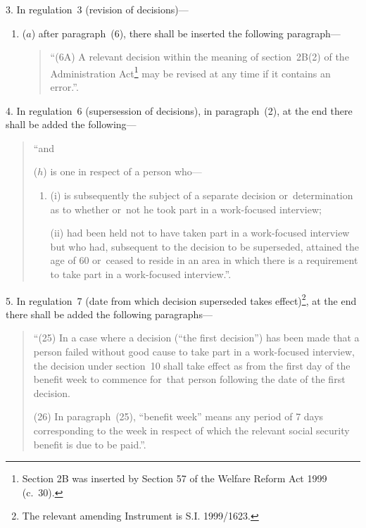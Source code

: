 \documentclass[12pt,a4paper]{article}
\begin{document}
3.  In regulation~3 (revision of decisions)—
\begin{enumerate}\item[]
($a$) after paragraph~(6), there shall be inserted the following paragraph—
\begin{quotation}
“(6A) A relevant decision within the meaning of section~2B(2) of the Administration Act\footnote{\frenchspacing Section 2B was inserted by Section 57 of the Welfare Reform Act 1999 (c.~30).} may be revised at any time if it contains an error.”.
\end{quotation}

%
\end{enumerate}


\medskip

4.  In regulation~6 (supersession of decisions), in paragraph~(2), at the end there shall be added the following—
\begin{quotation}
“and

($h$) is one in respect of a person who—
\begin{enumerate}\item[]
(i) is subsequently the subject of a separate decision or~determination as to whether or~not he took part in a work-focused interview;

(ii) had been held not to have taken part in a work-focused interview but who had, subsequent to the decision to be superseded, attained the age of 60 or~ceased to reside in an area in which there is a requirement to take part in a work-focused interview.”.
\end{enumerate}
\end{quotation}

\medskip

5.  In regulation~7 (date from which decision superseded takes effect)\footnote{\frenchspacing The relevant amending Instrument is S.I. 1999/1623.}, at the end there shall be added the following paragraphs—
\begin{quotation}
“(25) In a case where a decision (“the first decision”) has been made that a person failed without good cause to take part in a work-focused interview, the decision under section~10 shall take effect as from the first day of the benefit week to commence for~that person following the date of the first decision.

(26) In paragraph~(25), “benefit week” means any period of 7 days corresponding to the week in respect of which the relevant social security benefit is due to be paid.”.
\end{quotation}
\end{document}

